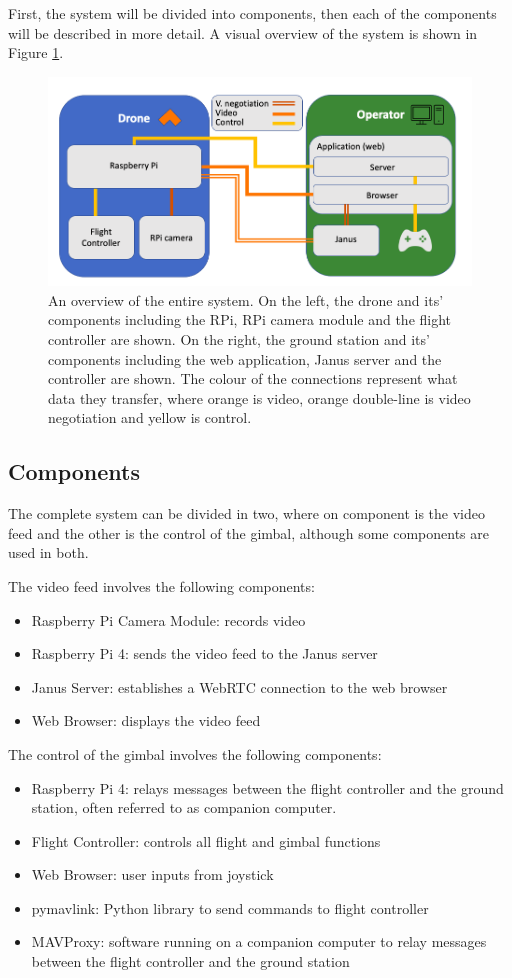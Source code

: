 \documentclass[nofilelist]{cslthse-msc}
\begin{document}
First, the system will be divided into components, then each of the components will be described in more detail. A visual overview of the system is shown in Figure \ref{fig:system-overview}.
\begin{figure}[!hbt]
   \centering
   \includegraphics[scale=0.5]{system-overview.png} 
   \caption{An overview of the entire system. On the left, the drone and its' components including the RPi, RPi camera module and the flight controller are shown. On the right, the ground station and its' components including the web application, Janus server and the controller are shown. The colour of the connections represent what data they transfer, where orange is video, orange double-line is video negotiation and yellow is control.}
   \label{fig:system-overview}
\end{figure}

\subsection{Components}
The complete system can be divided in two, where on component is the video feed and the other is the control of the gimbal, although some components are used in both.

The video feed involves the following components:
\begin{itemize}
   \item Raspberry Pi Camera Module: records video
   \item Raspberry Pi 4: sends the video feed to the Janus server
   \item Janus Server: establishes a WebRTC connection to the web browser
   \item Web Browser: displays the video feed
\end{itemize}

The control of the gimbal involves the following components:
\begin{itemize}
   \item Raspberry Pi 4: relays messages between the flight controller and the ground station, often referred to as companion computer.
   \item Flight Controller: controls all flight and gimbal functions
   \item Web Browser: user inputs from joystick
   \item pymavlink: Python library to send commands to flight controller
   \item MAVProxy: software running on a companion computer to relay messages between the flight controller and the ground station
\end{itemize}
\end{document}
